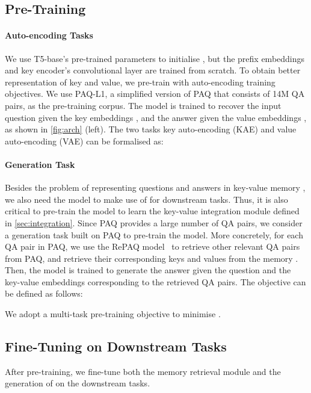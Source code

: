 \subsection{Pre-Training} \label{sec:pretrain}


\paragraph{Auto-encoding Tasks}
We use T5-base's pre-trained parameters to initialise \ModelName, but the prefix embeddings and key encoder's convolutional layer are trained from scratch.
To obtain better representation of key and value, we pre-train \ModelName with auto-encoding training objectives. We use PAQ-L1, a simplified version of PAQ that consists of 14M QA pairs, as the pre-training corpus.
The model is trained to recover the input question  given the key embeddings , and the answer  given the value embeddings , as shown in \cref{fig:arch} (left).
The two tasks key auto-encoding (KAE) and value auto-encoding (VAE) can be formalised as:



\paragraph{Generation Task}
Besides the problem of representing questions and answers in key-value memory , we also need the model to make use of  for downstream tasks. Thus, it is also critical to pre-train the model to learn the key-value integration module defined in \cref{sec:integration}.
Since PAQ provides a large number of QA pairs, we consider a generation task built on PAQ to pre-train the model.
More concretely, for each QA pair  in PAQ, we use the RePAQ model~\citep{paq} to retrieve  other relevant QA pairs from PAQ, and retrieve their corresponding keys  and values  from the memory .
Then, the model is trained to generate the answer  given the question  and the key-value embeddings corresponding to the retrieved QA pairs.
The objective can be defined as follows:

We adopt a multi-task pre-training objective to minimise .

\subsection{Fine-Tuning on Downstream Tasks} \label{sec:finetune}


After pre-training, we fine-tune both the memory retrieval module and the generation of \ModelName on the downstream tasks.


